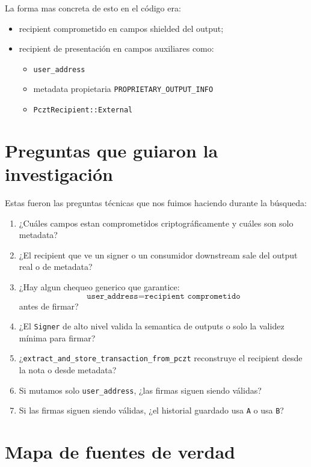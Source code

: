 \documentclass[11pt,a4paper]{article}
\begin{document}
La forma mas concreta de esto en el código era:

\begin{itemize}[leftmargin=2em]
    \item recipient comprometido en campos shielded del output;
    \item recipient de presentación en campos auxiliares como:
    \begin{itemize}
        \item \texttt{user\_address}
        \item metadata propietaria \texttt{PROPRIETARY\_OUTPUT\_INFO}
        \item \texttt{PcztRecipient::External}
    \end{itemize}
\end{itemize}

\section{Preguntas que guiaron la investigación}

Estas fueron las preguntas técnicas que nos fuimos haciendo durante la búsqueda:

\begin{enumerate}[leftmargin=2em]
    \item ¿Cuáles campos estan comprometidos criptográficamente y cuáles son solo metadata?
    \item ¿El recipient que ve un signer o un consumidor downstream sale del output real o de metadata?
    \item ¿Hay algun chequeo generico que garantice:
    \[
    \texttt{user\_address} = \texttt{recipient comprometido}
    \]
    antes de firmar?
    \item ¿El \texttt{Signer} de alto nivel valida la semantica de outputs o solo la validez mínima para firmar?
    \item ¿\texttt{extract\_and\_store\_transaction\_from\_pczt} reconstruye el recipient desde la nota o desde metadata?
    \item Si mutamos solo \texttt{user\_address}, ¿las firmas siguen siendo válidas?
    \item Si las firmas siguen siendo válidas, ¿el historial guardado usa \texttt{A} o usa \texttt{B}?
\end{enumerate}

\section{Mapa de fuentes de verdad}
\end{document}
